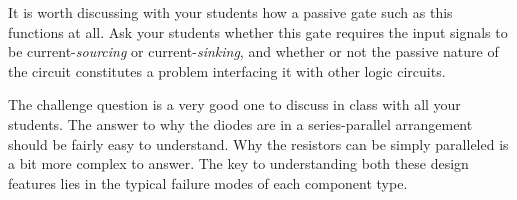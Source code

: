 
It is worth discussing with your students how a passive gate such as this functions at all.  Ask your students whether this gate requires the input signals to be current-{\it sourcing} or current-{\it sinking}, and whether or not the passive nature of the circuit constitutes a problem interfacing it with other logic circuits.

The challenge question is a very good one to discuss in class with all your students.  The answer to why the diodes are in a series-parallel arrangement should be fairly easy to understand.  Why the resistors can be simply paralleled is a bit more complex to answer.  The key to understanding both these design features lies in the typical failure modes of each component type.



